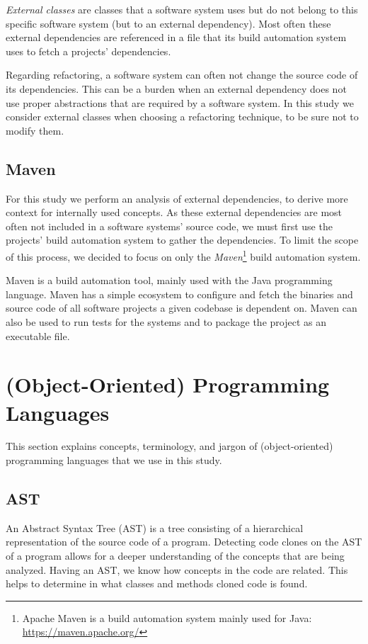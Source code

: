 \textit{External classes} are classes that a software system uses but do not belong to this specific software system (but to an external dependency). Most often these external dependencies are referenced in a file that its build automation system uses to fetch a projects' dependencies.

Regarding refactoring, a software system can often not change the source code of its dependencies. This can be a burden when an external dependency does not use proper abstractions that are required by a software system. In this study we consider external classes when choosing a refactoring technique, to be sure not to modify them.

\subsection{Maven}
For this study we perform an analysis of external dependencies, to derive more context for internally used concepts. As these external dependencies are most often not included in a software systems' source code, we must first use the projects' build automation system to gather the dependencies. To limit the scope of this process, we decided to focus on only the \textit{Maven}\footnote{Apache Maven is a build automation system mainly used for Java: \url{https://maven.apache.org/}} build automation system.

Maven is a build automation tool, mainly used with the Java programming language. Maven has a simple ecosystem to configure and fetch the binaries and source code of all software projects a given codebase is dependent on. Maven can also be used to run tests for the systems and to package the project as an executable file.

\section{(Object-Oriented) Programming Languages}
This section explains concepts, terminology, and jargon of (object-oriented) programming languages that we use in this study.

\subsection{AST} \label{sec:astbackground}
An Abstract Syntax Tree (AST) is a tree consisting of a hierarchical representation of the source code of a program. Detecting code clones on the AST of a program allows for a deeper understanding of the concepts that are being analyzed. Having an AST, we know how concepts in the code are related. This helps to determine in what classes and methods cloned code is found.

